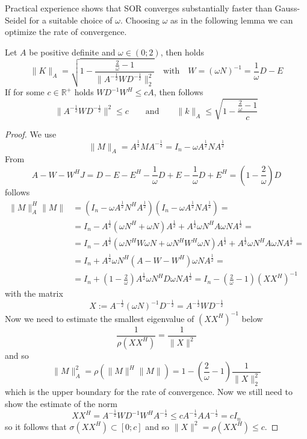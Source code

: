 Practical experience shows that SOR converges substantially faster than Gauss-Seidel for a suitable choice of \(\omega\).
Choosing \(\omega\) as in the following lemma we can optimize the rate of convergence.
\begin{lemma}\label{lem:sor_iter_mat_norm}
   Let \(A\) be positive definite and \(\omega \in (0; 2)\), then holds
   \[\|K\|_A = \sqrt{1 - \frac{\frac{2}{\omega} - 1}{\|A^{-\frac{1}{2}}WD^{-\frac{1}{2}}\|_2^2}} \quad\text{with}\quad W = (\omega N)^{-1} = \frac{1}{\omega}D - E\]
   If for some \(c \in \mathbb{R}^+\) holds \(WD^{-1}W^H \leq cA\), then follows
   \[\|A^{-\frac{1}{2}}WD^{-\frac{1}{2}}\|^2 \leq c \qquad\text{and}\qquad \|k\|_A \leq \sqrt{1 - \frac{\frac{2}{\omega} - 1}{c}}\]
\end{lemma}
\begin{proof}
   We use
   \[\|M\|_A = A^\frac{1}{2}MA^{-\frac{1}{2}} = I_n - \omega A^\frac{1}{2} N A^\frac{1}{2}\]
   From
   \[A - W - W^HJ = D - E - E^H - \frac{1}{\omega}D + E - \frac{1}{\omega}D + E^H = \left(1 - \frac{2}{\omega}\right)D\]
   follows
   \begin{equation*}
      \begin{split}
         \|M\|_A^H\|M\| & = (I_n - \omega A^\frac{1}{2}N^HA^\frac{1}{2})(I_n - \omega A^\frac{1}{2}NA^\frac{1}{2}) = \\
                        & = I_n - A^\frac{1}{2}(\omega N^H + \omega N)A^\frac{1}{2} + A^\frac{1}{2} \omega N^H A \omega N A^\frac{1}{2} = \\
                        & = I_n - A^\frac{1}{2}(\omega N^HW\omega N + \omega N^HW^H\omega N)A^\frac{1}{2} + A^\frac{1}{2}\omega N^HA\omega NA^\frac{1}{2} = \\
                        & = I_n + A^\frac{1}{2} \omega N^H(A - W - W^H) \omega NA^\frac{1}{2} = \\
                        & = I_n + \left(1 - \frac{2}{\omega}\right)A^\frac{1}{2} \omega N^HD\omega NA^\frac{1}{2} = I_n - \left(\frac{2}{\omega} - 1\right)(XX^H)^{-1}
      \end{split}
   \end{equation*}
   with the matrix
   \[X := A^{-\frac{1}{2}}(\omega N)^{-1}D^{-\frac{1}{2}} = A^{-\frac{1}{2}}WD^{-\frac{1}{2}}\]
   Now we need to estimate the smallest eigenvalue of \((XX^H)^{-1}\) below
   \[\frac{1}{\rho(XX^H)} = \frac{1}{\|X\|^2}\]
   and so
   \[\|M\|^2_A = \rho(\|M\|^H\|M\|) = 1 - \left(\frac{2}{\omega} - 1\right) \frac{1}{\|X\|_2^2}\]
   which is the upper boundary for the rate of convergence.
   Now we still need to show the estimate of the norm
   \[XX^H = A^{-\frac{1}{2}}WD^{-1}W^HA^{-\frac{1}{2}} \leq cA^{-\frac{1}{2}}AA^{-\frac{1}{2}} = cI_n\]
   so it follows that \(\sigma(XX^H) \subset [0; c]\) and so \(\|X\|^2 = \rho(XX^H) \leq c\).
\end{proof}

